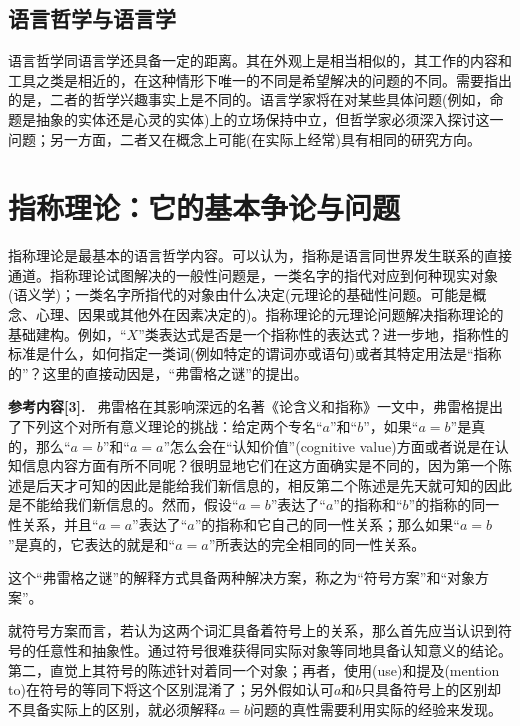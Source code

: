 \documentclass{article}
\begin{document}
\subsection{语言哲学与语言学}
语言哲学同语言学还具备一定的距离。其在外观上是相当相似的，其工作的内容和工具之类是相近的，在这种情形下唯一的不同是希望解决的问题的不同。需要指出的是，二者的哲学兴趣事实上是不同的。语言学家将在对某些具体问题(例如，命题是抽象的实体还是心灵的实体)上的立场保持中立，但哲学家必须深入探讨这一问题；另一方面，二者又在概念上可能(在实际上经常)具有相同的研究方向。
\section{指称理论：它的基本争论与问题}
指称理论是最基本的语言哲学内容。可以认为，指称是语言同世界发生联系的直接通道。指称理论试图解决的一般性问题是，一类名字的指代对应到何种现实对象(语义学)；一类名字所指代的对象由什么决定(元理论的基础性问题。可能是概念、心理、因果或其他外在因素决定的)。指称理论的元理论问题解决指称理论的基础建构。例如，“$X$”类表达式是否是一个指称性的表达式？进一步地，指称性的标准是什么，如何指定一类词(例如特定的谓词亦或语句)或者其特定用法是“指称的”？这里的直接动因是，“弗雷格之谜”的提出。

\textbf{\kaishu 参考内容[3].} \ {\kaishu 弗雷格在其影响深远的名著《论含义和指称》一文中，弗雷格提出了下列这个对所有意义理论的挑战：给定两个专名“$a$”和“$b$”，如果“$a=b$”是真的，那么“$a=b$”和“$a=a$”怎么会在“认知价值”(cognitive value)方面或者说是在认知信息内容方面有所不同呢？很明显地它们在这方面确实是不同的，因为第一个陈述是后天才可知的因此是能给我们新信息的，相反第二个陈述是先天就可知的因此是不能给我们新信息的。然而，假设“$a=b$”表达了“$a$”的指称和“$b$”的指称的同一性关系，并且“$a=a$”表达了“$a$”的指称和它自己的同一性关系；那么如果“$a=b$”是真的，它表达的就是和“$a=a$”所表达的完全相同的同一性关系。}

这个“弗雷格之谜”的解释方式具备两种解决方案，称之为“符号方案”和“对象方案”。

就符号方案而言，若认为这两个词汇具备着符号上的关系，那么首先应当认识到符号的任意性和抽象性。通过符号很难获得同实际对象等同地具备认知意义的结论。第二，直觉上其符号的陈述针对着同一个对象；再者，使用(use)和提及(mention to)在符号的等同下将这个区别混淆了；另外假如认可$a$和$b$只具备符号上的区别却不具备实际上的区别，就必须解释$a=b$问题的真性需要利用实际的经验来发现。
\end{document}
